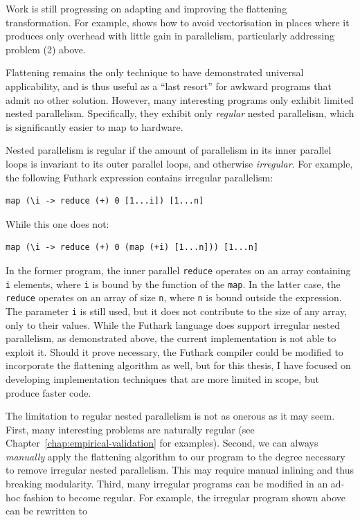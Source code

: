 Work is still progressing on adapting and improving the flattening
transformation.  For example, \cite{Keller:2012:VA:2364506.2364512}
shows how to avoid vectorisation in places where it produces only
overhead with little gain in parallelism, particularly addressing
problem (2) above.

Flattening remains the only technique to have demonstrated universal
applicability, and is thus useful as a ``last resort'' for awkward
programs that admit no other solution.  However, many interesting
programs only exhibit limited nested parallelism.  Specifically, they
exhibit only \textit{regular} nested parallelism, which is
significantly easier to map to hardware.

Nested parallelism is regular if the amount of parallelism in its
inner parallel loops is invariant to its outer parallel loops, and
otherwise \textit{irregular}.  For example, the following Futhark
expression contains irregular parallelism:

\begin{lstlisting}
map (\i -> reduce (+) 0 [1...i]) [1...n]
\end{lstlisting}

While this one does not:

\begin{lstlisting}
map (\i -> reduce (+) 0 (map (+i) [1...n])) [1...n]
\end{lstlisting}

In the former program, the inner parallel \lstinline{reduce} operates
on an array containing \lstinline{i} elements, where \lstinline{i} is
bound by the function of the \lstinline{map}.  In the latter case, the
\lstinline{reduce} operates on an array of size \lstinline{n}, where
\lstinline{n} is bound outside the expression.  The parameter
\lstinline{i} is still used, but it does not contribute to the size of
any array, only to their values.  While the Futhark language does
support irregular nested parallelism, as demonstrated above, the
current implementation is not able to exploit it.  Should it prove
necessary, the Futhark compiler could be modified to incorporate the
flattening algorithm as well, but for this thesis, I have focused on
developing implementation techniques that are more limited in scope,
but produce faster code.

The limitation to regular nested parallelism is not as onerous as it
may seem.  First, many interesting problems are naturally regular (see
Chapter~\ref{chap:empirical-validation} for examples).  Second, we can
always \textit{manually} apply the flattening algorithm to our program
to the degree necessary to remove irregular nested parallelism.  This
may require manual inlining and thus breaking modularity.  Third, many
irregular programs can be modified in an ad-hoc fashion to become
regular.  For example, the irregular program shown above can be
rewritten to

